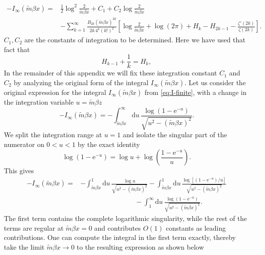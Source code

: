 \documentclass[a4paper,11pt]{article}
\newcommand{\e}{\mathrm e}
\newcommand{\dd}{\mathrm d}
\begin{document}
\begin{align}
	-I_\infty(\tilde m\beta x)
	={}&
	\frac12\log^2\!\frac{2}{\tilde m\beta x}
	+C_1+C_2\log\!\frac{2}{\tilde m\beta x}
	\nonumber\\
	&-
	\sum_{k=1}^{\infty}
	\frac{B_{2k}(\tilde m\beta x)^{2k}}
	{2k\,4^k(k!)^2}
	\left[
	\log\!\frac{2}{\tilde m\beta x}
	+\log(2\pi)
	+H_k-H_{2k-1}
	-\frac{\zeta'(2k)}{\zeta(2k)}
	\right].
	\label{eq:BP-before-constants}
\end{align}
$C_1, C_2$ are the constants of integration to be determined. Here we have used that fact that
\begin{equation}
	H_{k-1}+\frac1k=H_k,
\end{equation}
In the remainder of this appendix we will fix these integration constant $C_1$ and $C_2$ by analyzing the original form of the integral $I_{\infty}(\tilde{m}\beta x)$. Let us consider the original expression for the integral $I_{\infty}(\tilde m \beta x)$ from \eqref{eq:I-finite}, with a change in the integration variable $u=\tilde{m}\beta z$ 
\begin{equation}
	-I_\infty(\tilde m\beta x)
	=
	-\int_{\tilde m\beta x}^{\infty}\dd u\,
	\frac{\log(1-\e^{-u})}
	{\sqrt{u^2-(\tilde m\beta x)^2}}.
	\label{eq:BP-original-integral}
\end{equation}
We split the integration range at $u=1$ and isolate the singular part
of the numerator on $0<u<1$ by the exact identity
\begin{equation}
	\log(1-\e^{-u})
	=
	\log u
	+
	\log\!\left(\frac{1-\e^{-u}}{u}\right).
	\label{eq:BP-log-split}
\end{equation}
This gives
\begin{align}
	-I_\infty(\tilde m\beta x)
	={}&
	-\int_{\tilde m\beta x}^{1}\dd u\,
	\frac{\log u}{\sqrt{u^2-(\tilde m\beta x)^2}}
	-
	\int_{\tilde m\beta x}^{1}\dd u\,
	\frac{\log[(1-\e^{-u})/u]}
	{\sqrt{u^2-(\tilde m\beta x)^2}}
	\nonumber\\
	&\qquad\qquad\qquad\qquad-
	\int_{1}^{\infty}\dd u\,
	\frac{\log(1-\e^{-u})}
	{\sqrt{u^2-(\tilde m\beta x)^2}}.
	\label{eq:BP-C0-split}
\end{align}
The first term contains the complete logarithmic singularity, while
the rest of the terms are regular at $\tilde m \beta x=0$ and contributes $O(1)$ constants as  leading contributions. One can compute the integral in the first term exactly, thereby take the limit $\tilde m \beta x\to0  $ to the resulting expression as shown below
\end{document}
